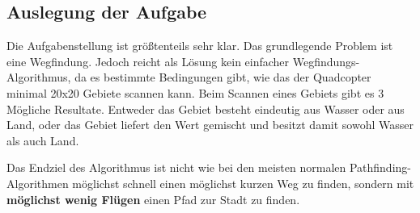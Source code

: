 \documentclass[a4paper,12pt]{article}
\begin{document}
\subsection{Auslegung der Aufgabe}
Die Aufgabenstellung ist größtenteils sehr klar. Das grundlegende Problem ist eine Wegfindung. Jedoch reicht als Lösung kein einfacher Wegfindungs-Algorithmus, da es bestimmte Bedingungen gibt, wie das der Quadcopter minimal 20x20 Gebiete scannen kann. Beim Scannen eines Gebiets gibt es 3 Mögliche Resultate. Entweder das Gebiet besteht eindeutig aus Wasser oder aus Land, oder das Gebiet liefert den Wert gemischt und besitzt damit sowohl Wasser als auch Land.

Das Endziel des Algorithmus ist nicht wie bei den meisten normalen Pathfinding-Algorithmen möglichst schnell einen möglichst kurzen Weg zu finden, sondern mit \textbf{möglichst wenig Flügen} einen Pfad zur Stadt zu finden.
\end{document}
